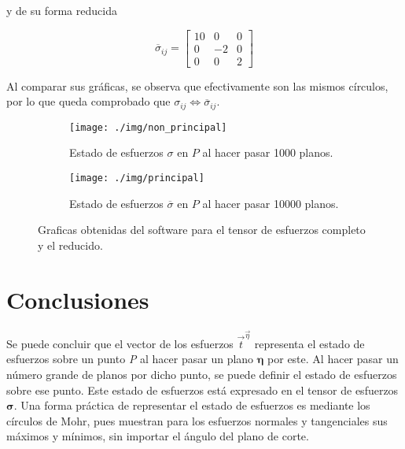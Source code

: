 \documentclass{article}
\begin{document}
    y de su forma reducida

    \begin{equation*}
        \overline{\sigma}_{ij} = 
        \begin{bmatrix}
            10 & 0 & 0\\
            0 & -2 & 0\\
            0 & 0 & 2
        \end{bmatrix}
    \end{equation*}

    \newpage

    Al comparar sus gr\'{a}ficas, se observa que efectivamente son las mismos c\'{i}rculos,
    por lo que queda comprobado que $\sigma_{ij} \Leftrightarrow \overline{\sigma}_{ij}$.

    \begin{figure}[H]
        \centering
        \begin{subfigure}[h!]{0.4\linewidth}
            \texttt{[image: ./img/non\_principal]}
            \caption{Estado de esfuerzos $\sigma$ en $P$ al hacer pasar 1000 planos.}
        \end{subfigure}
        \begin{subfigure}[h!]{0.4\linewidth}
            \texttt{[image: ./img/principal]}
            \caption{Estado de esfuerzos $\overline{\sigma}$ en $P$ al hacer pasar 10000 planos.}
        \end{subfigure}
        \caption{Graficas obtenidas del software para el tensor de esfuerzos completo y el reducido.}
        \label{fig:graficas_2}
    \end{figure}

    \section{Conclusiones}
    Se puede concluir que el vector de los esfuerzos $\vec{t}^{\vec{\eta}}$
    representa  el estado de esfuerzos sobre un punto \textit{P} al hacer pasar un plano
    $\bm{\eta}$ por este. Al hacer pasar un n\'{u}mero grande de planos por dicho punto, se puede
    definir el estado de esfuerzos sobre ese punto. Este estado de esfuerzos est\'{a} expresado
    en el tensor de esfuerzos $\bm{\sigma}$. Una forma pr\'{a}ctica de representar el estado de
    esfuerzos es mediante los c\'{i}rculos de Mohr, pues muestran para los esfuerzos normales 
    y tangenciales sus m\'{a}ximos y m\'{i}nimos, sin importar el \'{a}ngulo del plano de corte.
\end{document}
